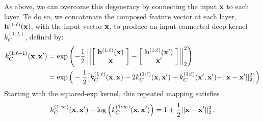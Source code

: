 As above, we can overcome this degeneracy by connecting the input ${\bf{x}}$ to each layer.
To do so, we concatenate the composed feature vector at each layer, ${\bf{h}}^{(1:\ell)}({\bf{x}})$, with the input vector ${\bf{x}}$, to produce an input-connected deep kernel $k_C^{(1:L)}$, defined by:
%
\begin{align}
k_C^{(1:\ell + 1)}({\bf{x}}, {\bf{x}}')
& = \exp \left( -\frac{1}{2} \left|\left| 
\left[ \! \begin{array}{c} {\bf{h}}^{(1:\ell)}({\bf{x}}) \\ {\bf{x}} \end{array} \! \right] - 
\left[ \! \begin{array}{c} {\bf{h}}^{(1:\ell)}({\bf{x}}') \\ {\bf{x}}' \end{array} \! \right] \right| \right|_2^2 \right) \\
& = \exp \Big( -\frac{1}{2} \big[ k_C^{(1:\ell)}({\bf{x}}, {\bf{x}}) - 2 k_C^{(1:\ell)}({\bf{x}}, {\bf{x}}') 
 + k_C^{(1:\ell)}({\bf{x}}', {\bf{x}}') {\color{black} - || {\bf{x}} - {\bf{x}}' ||_2^2} \big] \Big) \nonumber
\end{align}
%
Starting with the squared-exp kernel, this repeated mapping satisfies
\begin{align}
k_C^{(1:\infty)}({\bf{x}}, {\bf{x}}') - \log \left( k_C^{(1:\infty)}({\bf{x}}, {\bf{x}}') \right) = 1 + \frac{1}{2} || {\bf{x}} - {\bf{x}}' ||_2^2 \,.
\end{align}
%
